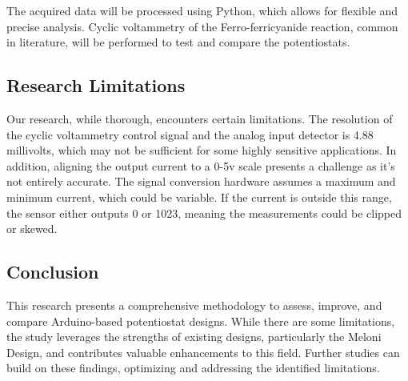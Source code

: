\documentclass{article}
\begin{document}
The acquired data will be processed using Python, which allows for flexible and precise analysis. Cyclic voltammetry of the Ferro-ferricyanide reaction, common in literature, will be performed to test and compare the potentiostats.

\subsection*{Research Limitations}
Our research, while thorough, encounters certain limitations. The resolution of the cyclic voltammetry control signal and the analog input detector is 4.88 millivolts, which may not be sufficient for some highly sensitive applications. In addition, aligning the output current to a 0-5v scale presents a challenge as it's not entirely accurate. The signal conversion hardware assumes a maximum and minimum current, which could be variable. If the current is outside this range, the sensor either outputs 0 or 1023, meaning the measurements could be clipped or skewed.

\subsection*{Conclusion}
This research presents a comprehensive methodology to assess, improve, and compare Arduino-based potentiostat designs. While there are some limitations, the study leverages the strengths of existing designs, particularly the Meloni Design, and contributes valuable enhancements to this field. Further studies can build on these findings, optimizing and addressing the identified limitations.
\end{document}
